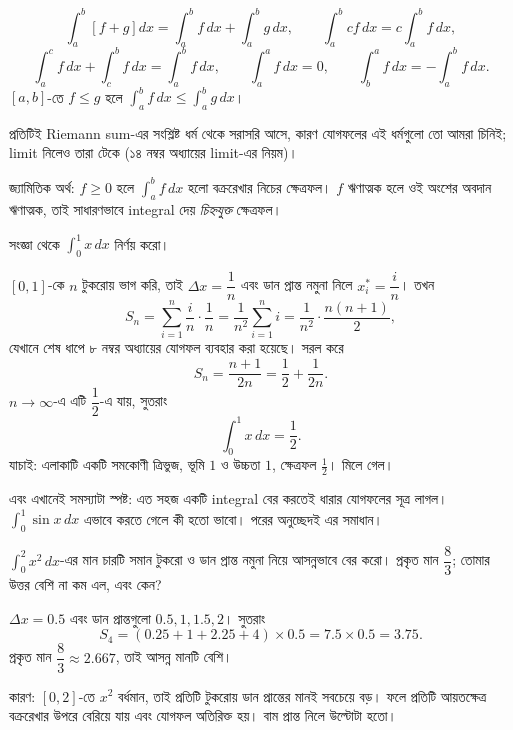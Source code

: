 \documentclass[11pt]{article}
\begin{document}
\begin{idea}[মৌলিক ধর্ম]
\[
  \int_{a}^{b}\left[ f + g \right]dx = \int_{a}^{b}f\,dx + \int_{a}^{b}g\,dx,
  \qquad
  \int_{a}^{b} cf\,dx = c\int_{a}^{b}f\,dx ,
\]
\[
  \int_{a}^{c}f\,dx + \int_{c}^{b}f\,dx = \int_{a}^{b}f\,dx, \qquad
  \int_{a}^{a}f\,dx = 0, \qquad
  \int_{b}^{a}f\,dx = -\int_{a}^{b}f\,dx .
\]
$[a,b]$-তে $f \leq g$ হলে $\int_{a}^{b}f\,dx \leq \int_{a}^{b}g\,dx$।
\end{idea}

প্রতিটিই Riemann sum-এর সংশ্লিষ্ট ধর্ম থেকে সরাসরি আসে, কারণ যোগফলের এই
ধর্মগুলো তো আমরা চিনিই; limit নিলেও তারা টেকে (১৪ নম্বর অধ্যায়ের limit-এর
নিয়ম)।

জ্যামিতিক অর্থ: $f \geq 0$ হলে $\int_{a}^{b}f\,dx$ হলো বক্ররেখার নিচের
ক্ষেত্রফল। $f$ ঋণাত্মক হলে ওই অংশের অবদান ঋণাত্মক, তাই সাধারণভাবে integral দেয়
\emph{চিহ্নযুক্ত} ক্ষেত্রফল।

\begin{example}
সংজ্ঞা থেকে $\int_{0}^{1} x\,dx$ নির্ণয় করো।
\end{example}

\begin{solbox}
$[0,1]$-কে $n$ টুকরোয় ভাগ করি, তাই $\Delta x = \dfrac{1}{n}$ এবং ডান প্রান্ত
নমুনা নিলে $x_{i}^{*} = \dfrac{i}{n}$। তখন
\[
  S_{n} = \sum_{i=1}^{n} \frac{i}{n} \cdot \frac{1}{n}
        = \frac{1}{n^{2}}\sum_{i=1}^{n} i
        = \frac{1}{n^{2}} \cdot \frac{n(n+1)}{2} ,
\]
যেখানে শেষ ধাপে ৮ নম্বর অধ্যায়ের যোগফল ব্যবহার করা হয়েছে। সরল করে
\[
  S_{n} = \frac{n+1}{2n} = \frac{1}{2} + \frac{1}{2n} .
\]
$n \to \infty$-এ এটি $\dfrac{1}{2}$-এ যায়, সুতরাং
\[
  \int_{0}^{1} x\,dx = \frac{1}{2} .
\]
যাচাই: এলাকাটি একটি সমকোণী ত্রিভুজ, ভূমি $1$ ও উচ্চতা $1$, ক্ষেত্রফল
$\tfrac{1}{2}$। মিলে গেল।

এবং এখানেই সমস্যাটা স্পষ্ট: এত সহজ একটি integral বের করতেই ধারার যোগফলের সূত্র
লাগল। $\int_{0}^{1}\sin x\,dx$ এভাবে করতে গেলে কী হতো ভাবো। পরের অনুচ্ছেদই
এর সমাধান।
\end{solbox}

 $\int_{0}^{2} x^{2}\,dx$-এর মান চারটি সমান টুকরো ও ডান প্রান্ত নমুনা
নিয়ে আসন্নভাবে বের করো। প্রকৃত মান $\dfrac{8}{3}$; তোমার উত্তর বেশি না কম
এল, এবং কেন?

\begin{sol}
$\Delta x = 0.5$ এবং ডান প্রান্তগুলো $0.5, 1, 1.5, 2$। সুতরাং
\[
  S_{4} = \left( 0.25 + 1 + 2.25 + 4 \right) \times 0.5 = 7.5 \times 0.5
  = 3.75 .
\]
প্রকৃত মান $\dfrac{8}{3} \approx 2.667$, তাই আসন্ন মানটি বেশি।

কারণ: $[0,2]$-তে $x^{2}$ বর্ধমান, তাই প্রতিটি টুকরোয় ডান প্রান্তের মানই
সবচেয়ে বড়। ফলে প্রতিটি আয়তক্ষেত্র বক্ররেখার উপরে বেরিয়ে যায় এবং যোগফল
অতিরিক্ত হয়। বাম প্রান্ত নিলে উল্টোটা হতো।
\end{sol}
\end{document}
